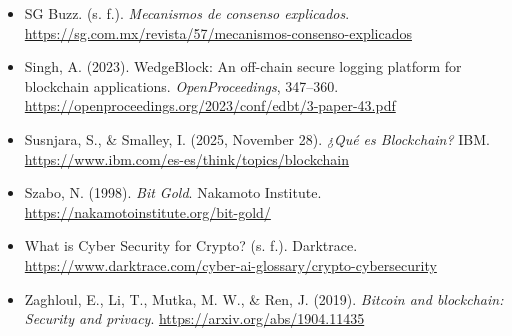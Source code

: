 \documentclass[12pt,a4paper]{article}
\begin{document}
\begin{itemize}
\item SG Buzz. (s. f.). \textit{Mecanismos de consenso explicados}.
\url{https://sg.com.mx/revista/57/mecanismos-consenso-explicados}

\item Singh, A. (2023). WedgeBlock: An off-chain secure logging platform for blockchain applications. \textit{OpenProceedings}, 347--360.
\url{https://openproceedings.org/2023/conf/edbt/3-paper-43.pdf}

\item Susnjara, S., \& Smalley, I. (2025, November 28). \textit{¿Qué es Blockchain?} IBM.
\url{https://www.ibm.com/es-es/think/topics/blockchain}

\item Szabo, N. (1998). \textit{Bit Gold}. Nakamoto Institute.
\url{https://nakamotoinstitute.org/bit-gold/}

\item What is Cyber Security for Crypto? (s. f.). Darktrace.
\url{https://www.darktrace.com/cyber-ai-glossary/crypto-cybersecurity}

\item Zaghloul, E., Li, T., Mutka, M. W., \& Ren, J. (2019). \textit{Bitcoin and blockchain: Security and privacy}.
\url{https://arxiv.org/abs/1904.11435}

\end{itemize}
\end{document}
